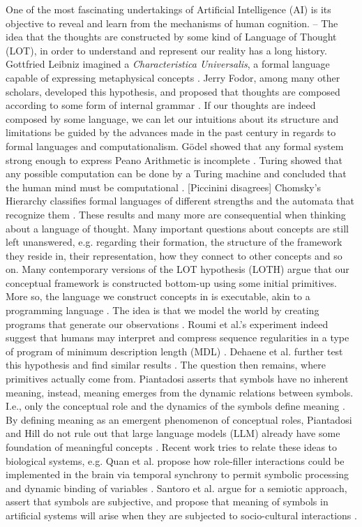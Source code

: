One of the most fascinating undertakings of Artificial Intelligence (AI) is its objective to reveal and learn from the mechanisms of human cognition.
--
The idea that the thoughts are constructed by some kind of Language of Thought (LOT), in order to understand and represent our reality has a long history. 
Gottfried Leibniz imagined a \textit{Characteristica Universalis}, a formal language capable of expressing metaphysical concepts \cite{sep-leibniz-logic-influence}.
Jerry Fodor, among many other scholars, developed this hypothesis, and proposed that thoughts are composed according to some form of internal grammar \cite{sep-language-thought}.
If our thoughts are indeed composed by some language, we can let our intuitions about its structure and limitations be guided by the advances made in the past century in regards to formal languages and computationalism.
Gödel showed that any formal system strong enough to express Peano Arithmetic is incomplete \cite{sep-goedel-incompleteness}. Turing showed that any possible computation can be done by a Turing machine and concluded that the human mind must be computational \cite{JCopeland2004-JCOTET}. [Piccinini disagrees]
Chomsky's Hierarchy classifies formal languages of different strengths and the automata that recognize them \cite{chomsky1959certain}.
These results and many more are consequential when thinking about a language of thought.
Many important questions about concepts are still left unanswered, e.g. regarding their formation, the structure of the framework they reside in, their representation, how they connect to other concepts and so on. 
Many contemporary versions of the LOT hypothesis (LOTH) argue that our conceptual framework is constructed bottom-up using some initial primitives. More so, the language we construct concepts in is executable, akin to a programming language \cite{dehaene_symbols_2022}. The idea is that we model the world by creating programs that generate our observations \cite{rule_child_2020}. 
Roumi et al.'s experiment indeed suggest that humans may interpret and compress sequence regularities in a type of program of minimum description length (MDL) \cite{al_roumi_mental_2021}.
Dehaene et al. further test this hypothesis and find similar results \cite{dehaene_symbols_2022}.
The question then remains, where primitives actually come from.
Piantadosi asserts that symbols have no inherent meaning, instead, meaning emerges from the dynamic relations between symbols. I.e., only the conceptual role and the dynamics of the symbols define meaning \cite{piantadosi2021computational}.
By defining meaning as an emergent phenomenon of conceptual roles, Piantadosi and Hill do not rule out that large language models (LLM) already have some foundation of meaningful concepts \cite{piantasodi2022meaning}.
Recent work tries to relate these ideas to biological systems, e.g. Quan et al. propose how role-filler interactions could be implemented in the brain via temporal synchrony to permit symbolic processing and dynamic binding of variables \cite{do2021neural}.
Santoro et al. argue for a semiotic approach, assert that symbols are subjective, and propose that meaning of symbols in artificial systems will arise when they are subjected to socio-cultural interactions \cite{santoro2021symbolic}.

